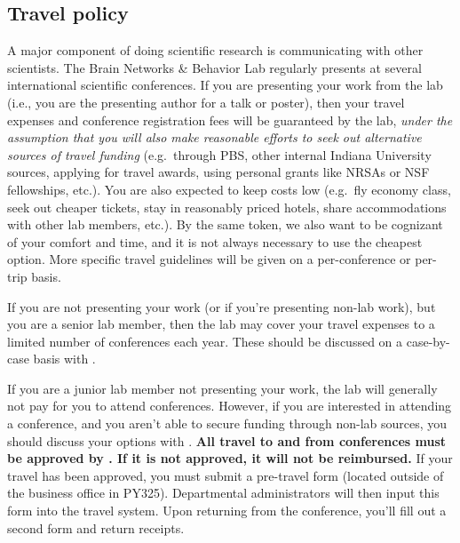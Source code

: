 \documentclass{tufte-book} %
\begin{document}
 \subsection{Travel policy}

A major component of doing scientific research is communicating with other scientists. The Brain Networks \& Behavior Lab regularly presents at several international scientific conferences. If you are presenting your work from the lab (i.e., you are the presenting author for a talk or poster), then your travel expenses and conference registration fees will be guaranteed by the lab, \textit{under the assumption that you will also make reasonable efforts to seek out alternative sources of travel funding} (e.g.\ through PBS, other internal Indiana University sources, applying for travel awards, using personal grants like NRSAs or NSF fellowships, etc.). You are also expected to keep costs low (e.g.\ fly economy class, seek out cheaper tickets, stay in reasonably priced hotels, share accommodations with other lab members, etc.). By the same token, we also want to be cognizant of your comfort and time, and it is not always necessary to use the cheapest option. More specific travel guidelines will be given on a per-conference or per-trip basis.

If you are not presenting your work (or if you're presenting non-lab work), but you are a senior lab member, then the lab may cover your travel expenses to a limited number of conferences each year. These should be discussed on a case-by-case basis with \director.



If you are a junior lab member not presenting your work, the lab will generally not pay for you to attend conferences. However, if you are interested in attending a conference, and you aren't able to secure funding through non-lab sources, you should discuss your options with \director. \textbf{All travel to and from conferences must be approved by \director. If it is not approved, it will not be reimbursed.} If your travel has been approved, you must submit a pre-travel form (located outside of the business office in PY325). Departmental administrators will then input this form into the travel system. Upon returning from the conference, you'll fill out a second form and return receipts.
\end{document}
